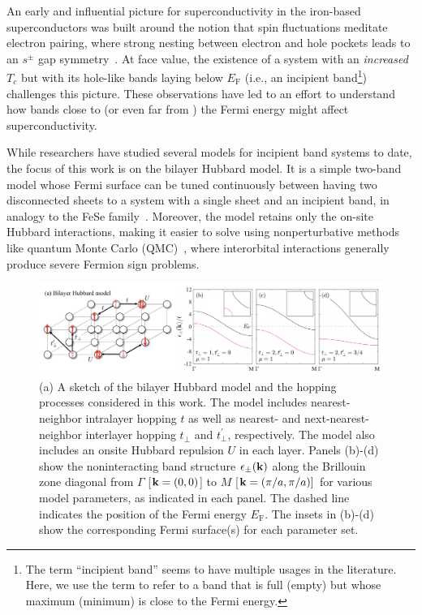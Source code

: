 \documentclass[prb,twocolumn,amsmath,amssymb,superscriptaddress,floatfix,nofootinbib]{revtex4-2}
\begin{document}
An early and influential picture for superconductivity in the iron-based superconductors \cite{Mazin2008} was built around the notion that spin fluctuations meditate electron pairing, where strong nesting between electron and hole pockets leads to an $s^\pm$ gap symmetry~\cite{Kuroki2008, Mazin2008, Hirschfeld_2011}. At face value, the existence of a system with an \emph{increased} $T_c$ but with its hole-like bands laying below $E_\mathrm{F}$ (i.e., an incipient band\footnote{The term ``incipient band'' seems to have multiple usages in the literature. Here, we use the term to refer to a band that is full (empty) but whose maximum (minimum) is close to the Fermi energy.}) challenges this picture. These observations have led to an effort to understand how bands close to \cite{Hirschfeld_2011, PhysRevB.93.155159, PhysRevB.91.161108, BangNJP2014, ChenPRB2015, Mishra2016, LinscheidPRL2016, KurokiFlex2020, KurokiVMC2020, Maier2019, RademakerEnhanced2021} (or even far from \cite{PhysRevB.97.060501}) the Fermi energy might affect superconductivity. 

While researchers have studied several models for incipient band systems to date, the focus of this work is on the bilayer Hubbard model. It is a simple two-band model whose Fermi surface can be tuned continuously between having two disconnected sheets to a system with a single sheet and an incipient band, in analogy to the FeSe family~\cite{Maier2011}. Moreover, the model retains only the on-site Hubbard interactions, making it easier to solve using nonperturbative methods like quantum Monte Carlo (QMC)~\cite{Maier2011, Maier2019, PelliciariRIXS2020, KurokiVMC2020},  where interorbital interactions generally produce severe Fermion sign problems.

\begin{figure}[t]
    \centering
    \includegraphics[width=\textwidth]{./Bilayer_Sketch.png}
    \caption{(a) A sketch of the bilayer Hubbard model and the hopping processes considered in this work. The model includes nearest-neighbor intralayer hopping $t$ as well as nearest- and next-nearest-neighbor interlayer hopping $t^{\phantom\dagger}_\perp$ and $t^\prime_\perp$, respectively. The model also includes an onsite Hubbard repulsion $U$ in each layer. Panels (b)-(d) show the noninteracting band structure $\epsilon_\pm({\bf k})$ along the Brillouin zone diagonal from $\Gamma$ [${\bf k } = (0,0)$] to $M$ [${\bf k} = (\pi/a,\pi/a)]$ for various model parameters, as indicated in each panel. The dashed line indicates the position of the Fermi energy $E_\mathrm{F}$. The insets in (b)-(d) show the corresponding Fermi 
    surface(s) for each parameter set.}
    \label{fig:bilayer_sketch}
\end{figure}
\end{document}
